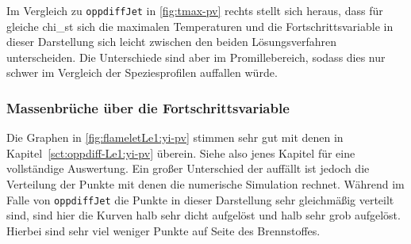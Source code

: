 Im Vergleich zu \lstinline!oppdiffJet! in \autoref{fig:tmax-pv} rechts stellt sich heraus, dass für gleiche \gls{chi_st} sich die maximalen Temperaturen und die Fortschrittsvariable in dieser Darstellung sich leicht zwischen den beiden Lösungsverfahren unterscheiden. Die Unterschiede sind aber im Promillebereich, sodass dies nur schwer im Vergleich der Speziesprofilen auffallen würde.


\subsubsection{Massenbrüche über die Fortschrittsvariable}

Die Graphen in \autoref{fig:flameletLe1:yi-pv} stimmen sehr gut mit denen in Kapitel~\ref{sct:oppdiff-Le1:yi-pv} überein. Siehe also jenes Kapitel für eine vollständige Auswertung. Ein großer Unterschied der auffällt ist jedoch die Verteilung der Punkte mit denen die numerische Simulation rechnet. Während im Falle von \lstinline!oppdiffJet! die Punkte in dieser Darstellung sehr gleichmäßig verteilt sind, sind hier die Kurven halb sehr dicht aufgelöst und halb sehr grob aufgelöst. Hierbei sind sehr viel weniger Punkte auf Seite des Brennstoffes.

